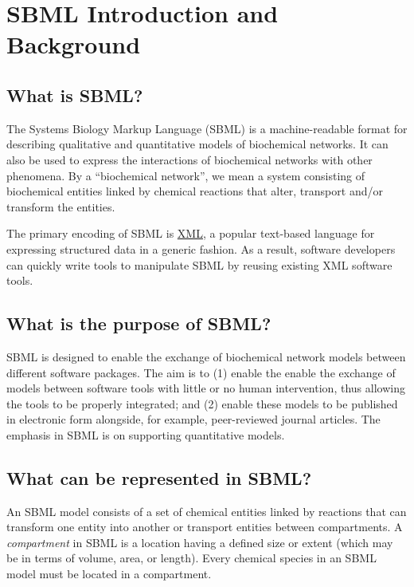 \documentclass{sbmlfaq}
\begin{document}
\section{SBML Introduction and Background}
\label{sec:intro}

\subsection{What is SBML?}

The Systems Biology Markup Language (SBML) is a machine-readable format for
describing qualitative and quantitative models of biochemical networks.  It
can also be used to express the interactions of biochemical networks with
other phenomena.  By a ``biochemical network'', we mean a system consisting
of biochemical entities linked by chemical reactions that alter, transport
and/or transform the entities.

The primary encoding of SBML is \href{http://www.w3.org/XML/}{XML}, a
popular text-based language for expressing structured data in a generic
fashion.  As a result, software developers can quickly write tools to
manipulate SBML by reusing existing XML software tools.


\subsection{What is the purpose of SBML?}

SBML is designed to enable the exchange of biochemical network models
between different software packages.  The aim is to (1) enable the enable
the exchange of models between software tools with little or no human
intervention, thus allowing the tools to be properly integrated; and (2)
enable these models to be published in electronic form alongside, for
example, peer-reviewed journal articles.  The emphasis in SBML is on
supporting quantitative models.


\subsection{What can be represented in SBML?}

An SBML model consists of a set of chemical entities linked by reactions
that can transform one entity into another or transport entities between
compartments.  A \emph{compartment} in SBML is a location having a defined
size or extent (which may be in terms of volume, area, or length).  Every
chemical species in an SBML model must be located in a compartment.
\end{document}
